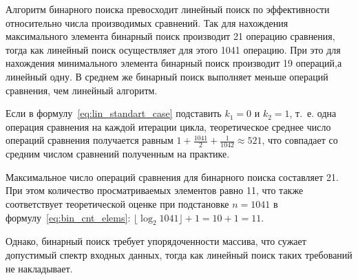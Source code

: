 Алгоритм бинарного поиска превосходит линейный поиск по эффективности относительно числа производимых сравнений. Так для нахождения максимального элемента бинарный поиск производит 21 операцию сравнения, тогда как линейный поиск осуществляет для этого 1041 операцию. При это для нахождения минимального элемента бинарный поиск производит 19 операций,а линейный одну. В среднем же бинарный поиск выполняет меньше операций сравнения, чем линейный алгоритм.

Если в формулу~\ref{eq:lin_standart_case} подставить $k_1 = 0$ и $k_2 = 1$, т.~е. одна операция сравнения на каждой итерации цикла, теоретическое среднее число операций сравнения получается равным $1 + \frac{1041}{2} + \frac{1}{1042} \approx 521$, что совпадает со средним числом сравнений полученным на практике.

Максимальное число операций сравнения для бинарного поиска составляет 21. При этом количество просматриваемых элементов равно 11, что также соответствует теоретической оценке при подстановке $n = 1041$ в формулу~\ref{eq:bin_cnt_elems}: $\lfloor \log_2{1041} \rfloor + 1 = 10 + 1 = 11$.

Однако, бинарный поиск требует упорядоченности массива, что сужает допустимый спектр входных данных, тогда как линейный поиск таких требований не накладывает.


\clearpage